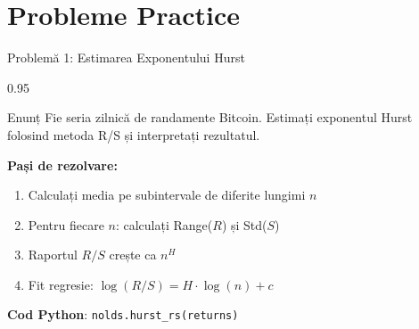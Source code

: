 \documentclass[9pt, aspectratio=169, t]{beamer}
\begin{document}
\section{Probleme Practice}

\begin{frame}{Problemă 1: Estimarea Exponentului Hurst}
    \begin{cminipage}{0.95\textwidth}
    \begin{block}{Enunț}
        Fie seria zilnică de randamente Bitcoin. Estimați exponentul Hurst folosind metoda R/S și interpretați rezultatul.
    \end{block}

    \vspace{0.3cm}
    \textbf{Pași de rezolvare:}
    \begin{enumerate}\setlength{\itemsep}{0pt}
        \item Calculați media pe subintervale de diferite lungimi $n$
        \item Pentru fiecare $n$: calculați Range($R$) și Std($S$)
        \item Raportul $R/S$ crește ca $n^H$
        \item Fit regresie: $\log(R/S) = H \cdot \log(n) + c$
    \end{enumerate}

    \vspace{0.2cm}
    \textbf{Cod Python}: \texttt{nolds.hurst\_rs(returns)}
    \end{cminipage}
\end{frame}
\end{document}

